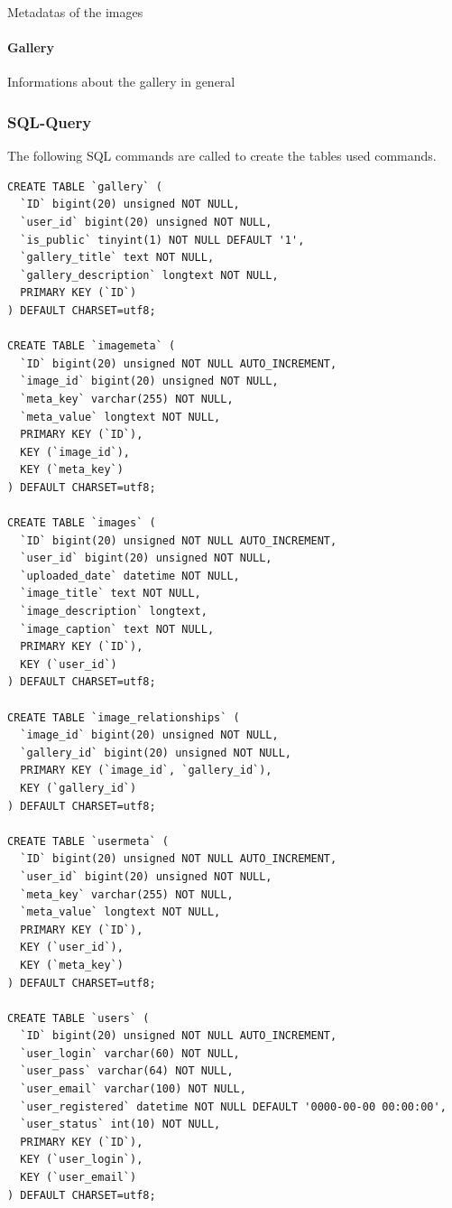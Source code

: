 \documentclass[a4paper,12pt,oneside]{article} %
\begin{document}
Metadatas of the images


\paragraph*{Gallery}

Informations about the gallery in general


\subsubsection{SQL-Query}

The following SQL commands are called to create the tables used commands.

\begin{lstlisting}
CREATE TABLE `gallery` (
  `ID` bigint(20) unsigned NOT NULL,
  `user_id` bigint(20) unsigned NOT NULL,
  `is_public` tinyint(1) NOT NULL DEFAULT '1',
  `gallery_title` text NOT NULL,
  `gallery_description` longtext NOT NULL,
  PRIMARY KEY (`ID`)
) DEFAULT CHARSET=utf8;

CREATE TABLE `imagemeta` (
  `ID` bigint(20) unsigned NOT NULL AUTO_INCREMENT,
  `image_id` bigint(20) unsigned NOT NULL,
  `meta_key` varchar(255) NOT NULL,
  `meta_value` longtext NOT NULL,
  PRIMARY KEY (`ID`),
  KEY (`image_id`),
  KEY (`meta_key`)
) DEFAULT CHARSET=utf8;

CREATE TABLE `images` (
  `ID` bigint(20) unsigned NOT NULL AUTO_INCREMENT,
  `user_id` bigint(20) unsigned NOT NULL,
  `uploaded_date` datetime NOT NULL,
  `image_title` text NOT NULL,
  `image_description` longtext,
  `image_caption` text NOT NULL,
  PRIMARY KEY (`ID`),
  KEY (`user_id`)
) DEFAULT CHARSET=utf8;

CREATE TABLE `image_relationships` (
  `image_id` bigint(20) unsigned NOT NULL,
  `gallery_id` bigint(20) unsigned NOT NULL,
  PRIMARY KEY (`image_id`, `gallery_id`),
  KEY (`gallery_id`)
) DEFAULT CHARSET=utf8;

CREATE TABLE `usermeta` (
  `ID` bigint(20) unsigned NOT NULL AUTO_INCREMENT,
  `user_id` bigint(20) unsigned NOT NULL,
  `meta_key` varchar(255) NOT NULL,
  `meta_value` longtext NOT NULL,
  PRIMARY KEY (`ID`),
  KEY (`user_id`),
  KEY (`meta_key`)
) DEFAULT CHARSET=utf8;

CREATE TABLE `users` (
  `ID` bigint(20) unsigned NOT NULL AUTO_INCREMENT,
  `user_login` varchar(60) NOT NULL,
  `user_pass` varchar(64) NOT NULL,
  `user_email` varchar(100) NOT NULL,
  `user_registered` datetime NOT NULL DEFAULT '0000-00-00 00:00:00',
  `user_status` int(10) NOT NULL,
  PRIMARY KEY (`ID`),
  KEY (`user_login`),
  KEY (`user_email`)
) DEFAULT CHARSET=utf8;
\end{lstlisting}
\end{document}
